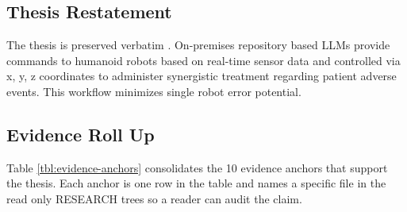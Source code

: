 %
%

\begin{sectionaccent}

\subsection{Thesis Restatement}
\label{sec:conclusions-thesis}

The thesis is preserved verbatim
\cite{kawchak_2026_humanoid_instructions}. On-premises repository
based LLMs provide commands to humanoid robots based on real-time
sensor data and controlled via x, y, z coordinates to administer
synergistic treatment regarding patient adverse events. This
workflow minimizes single robot error potential.

\subsection{Evidence Roll Up}
\label{sec:conclusions-evidence}

Table \ref{tbl:evidence-anchors} consolidates the 10 evidence anchors
that support the thesis. Each anchor is one row in the table and
names a specific file in the read only RESEARCH trees so a reader
can audit the claim.


\end{sectionaccent}
